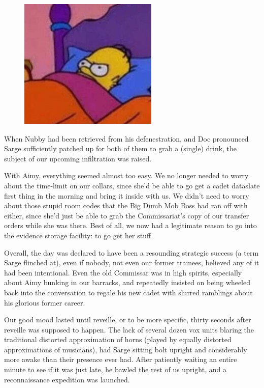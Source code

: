 \begin{figure}
	\begin{center}
		\includegraphics[width=\figwidth]{pics/21/60.png}
	\end{center}
\end{figure}
When Nubby had been retrieved from his defenestration, and Doc pronounced Sarge sufficiently patched up for both of them to grab a (single) drink, the subject of our upcoming infiltration was raised. 


With Aimy, everything seemed almost too easy. 
We no longer needed to worry about the time-limit on our collars, since she'd be able to go get a cadet dataslate first thing in the morning and bring it inside with us. 
We didn't need to worry about those stupid room codes that the Big Dumb Mob Boss had ran off with either, since she'd just be able to grab the Commissariat's copy of our transfer orders while she was there. 
Best of all, we now had a legitimate reason to go into the evidence storage facility: 
to go get her stuff. 


Overall, the day was declared to have been a resounding strategic success (a term Sarge flinched at), even if nobody, not even our former trainees, believed any of it had been intentional. 
Even the old Commissar was in high spirits, especially about Aimy bunking in our barracks, and repeatedly insisted on being wheeled back into the conversation to regale his new cadet with slurred ramblings about his glorious former career. 


Our good mood lasted until reveille, or to be more specific, thirty seconds after reveille was supposed to happen. 
The lack of several dozen vox units blaring the traditional distorted approximation of horns (played by equally distorted approximations of musicians), had Sarge sitting bolt upright and considerably more awake than their presence ever had. 
After patiently waiting an entire minute to see if it was just late, he bawled the rest of us upright, and a reconnaissance expedition was launched.

